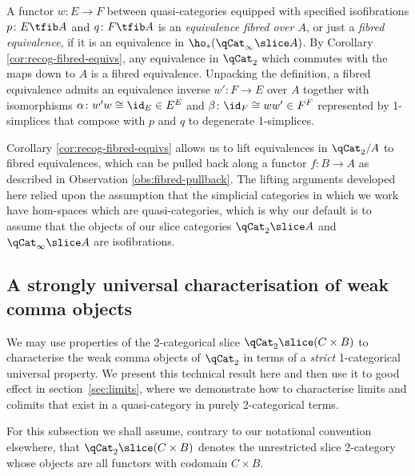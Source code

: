   \begin{defn}\label{defn:fibred-equivalence}
  A functor $w \colon E \to F$ between quasi-categories equipped with specified isofibrations $p\colon E \tfib A$ and $q \colon F \tfib A$ is an {\em equivalence fibred over $A$\/}, or just a {\em fibred equivalence}, if it is an equivalence in $\ho_*(\qCat_\infty\slice A)$. By Corollary \ref{cor:recog-fibred-equivs}, any equivalence in $\qCat_2$ which commutes with the maps down to $A$ is a fibred equivalence. Unpacking the definition, a fibred equivalence admits an equivalence inverse $w' \colon F \to E$ over $A$ together with isomorphisms $\alpha \colon w' w \cong \id_E \in E^E$ and $\beta \colon \id_F \cong w w' \in F^F$ represented by 1-simplices that compose with $p$ and $q$ to degenerate 1-simplices.
    \end{defn}

Corollary \ref{cor:recog-fibred-equivs} allows us to lift equivalences in $\qCat_2/A$ to fibred equivalences, which can be pulled back along a functor $f \colon B \to A$ as described in Observation \ref{obs:fibred-pullback}. The lifting arguments developed here relied upon the assumption that the simplicial categories in which we work have hom-spaces which are quasi-categories, which is why our default is to assume that the objects of our slice categories $\qCat_2\slice A$ and $\qCat_\infty\slice A$ are isofibrations.
  
\subsection{A strongly universal characterisation of weak comma objects}

We may use properties of the 2-categorical slice $\qCat_2\slice (C \times B)$ to characterise the weak comma objects of $\qCat_2$ in terms of a \emph{strict} 1-categorical universal property. We present this technical result here and then use it to good effect in section~\ref{sec:limits}, where we demonstrate how to characterise limits and colimits that exist in a quasi-category in purely 2-categorical terms.

For this subsection we shall assume, contrary to our notational convention elsewhere, that $\qCat_2\slice(C\times B)$ denotes the unrestricted slice 2-category whose objects are all functors with codomain $C\times B$.

